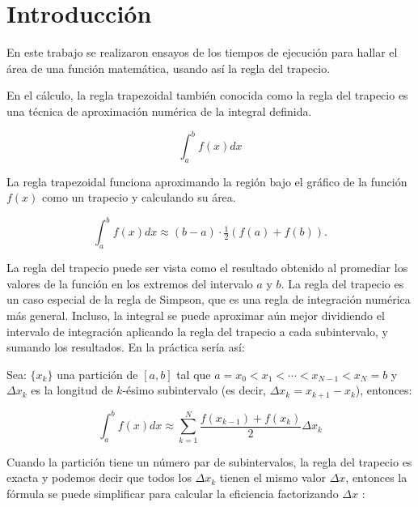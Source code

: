 \documentclass[a4paper]{article}
\begin{document}





\section{Introducción}
En este trabajo se realizaron ensayos de los tiempos de ejecución para hallar el área
de una función matemática, usando así la regla del trapecio.

En el cálculo, la regla trapezoidal también conocida como la regla del trapecio es una
técnica de aproximación numérica de la integral definida.

\begin{equation}
\int_{a}^{b} f(x) dx
\end{equation}

La regla trapezoidal funciona aproximando la región bajo el gráfico de la función $f(x)$
como un trapecio y calculando su área.

\begin{equation}
\int_{a}^{b} f(x) dx \approx (b-a) \cdot \tfrac{1}{2}(f(a) + f(b)).
\end{equation}

La regla del trapecio puede ser vista como el resultado obtenido al promediar los valores
de la función en los extremos del intervalo $a$ y $b$. La regla del trapecio es un caso
especial de la regla de Simpson, que es una regla de integración numérica más general.
Incluso, la integral se puede aproximar aún mejor dividiendo el intervalo de integración
aplicando la regla del trapecio a cada subintervalo, y sumando los resultados.
En la práctica sería así\nocite{cruz2002sharp}:

Sea: $\{x_k\}$ una partición de $[a,b]$ tal que $a = x_0 < x_1 < \cdots < x_{N-1} < x_N = b$
y $\Delta{x_k}$ es la longitud de $k$-ésimo subintervalo (es decir, $\Delta{x_k} = x_{k+1} - x_k$), entonces:

\begin{equation}
\int_{a}^{b} f(x) dx \approx \sum_{k=1}^{N} \frac{f(x_{k-1}) + f(x_{k})}{2}  \Delta{x_k} 
\end{equation}

Cuando la partición tiene un número par de subintervalos, la regla del trapecio es exacta
y podemos decir que todos los $\Delta{x_k}$ tienen el mismo valor $\Delta{x}$, entonces
la fórmula se puede simplificar para calcular la eficiencia factorizando $\Delta{x}$ \nocite{rahman1990characterization}:
\end{document}
